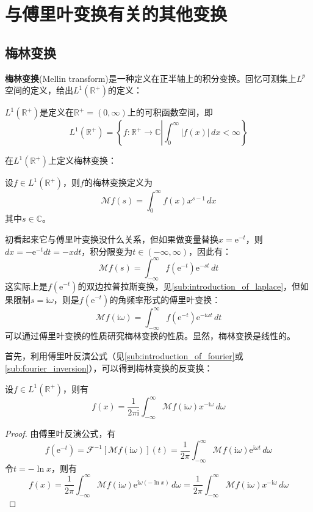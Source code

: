 \section{与傅里叶变换有关的其他变换}\label{sec:Other_Transforms}

\subsection{梅林变换}\label{sub:mellin}

\textbf{梅林变换}(Mellin transform)是一种定义在正半轴上的积分变换。回忆可测集上$L^p$空间的定义，给出$L^1(\mathbb{R}^+)$的定义：
\begin{definition}
    $L^1(\mathbb{R}^+)$是定义在$\mathbb{R}^+=(0,\infty)$上的可积函数空间，即
    $$L^1(\mathbb{R}^+)=\left\{f:\mathbb{R}^+\to\mathbb{C}\left|\int_0^{\infty}|f(x)|\,dx<\infty\right.\right\}$$
\end{definition}

在$L^1(\mathbb{R}^+)$上定义梅林变换：

\begin{definition}[梅林变换]
    设$f\in L^1(\mathbb{R}^+)$，则$f$的梅林变换定义为
    \[\mathcal{M} f(s)=\int_0^{\infty}f(x)x^{s-1}\,dx\]
    其中$s\in\mathbb{C}$。    
\end{definition}

初看起来它与傅里叶变换没什么关系，但如果做变量替换$x=\mathrm{e}^{-t}$，则$dx=-\mathrm{e}^{-t}dt=-x dt$，积分限变为$t\in(-\infty,\infty)$，因此有：
\[\mathcal{M} f(s)=\int_{-\infty}^{\infty}f(\mathrm{e}^{-t})\mathrm{e}^{-s t}\,dt\]
这实际上是$f(\mathrm{e}^{-t})$的双边拉普拉斯变换，见\ref{sub:introduction_of_laplace}，但如果限制$s=\mathrm{i}\omega$，则是$f(\mathrm{e}^{-t})$的角频率形式的傅里叶变换：
\[\mathcal{M} f(\mathrm{i}\omega)=\int_{-\infty}^{\infty}f(\mathrm{e}^{-t})\mathrm{e}^{-\mathrm{i}\omega t}\,dt\]
可以通过傅里叶变换的性质研究梅林变换的性质。显然，梅林变换是线性的。

首先，利用傅里叶反演公式（见\ref{sub:introduction_of_fourier}或\ref{sub:fourier_inversion}），可以得到梅林变换的反变换：
\begin{proposition}[梅林反变换]
    设$f\in L^1(\mathbb{R}^+)$，则有
    \[f(x)=\frac{1}{2\pi \mathrm{i}}\int_{-\infty}^{\infty}\mathcal{M} f(\mathrm{i}\omega)x^{-\mathrm{i}\omega}\,d\omega\]
\end{proposition}
\begin{proof}
    由傅里叶反演公式，有
    \[f(\mathrm{e}^{-t})=\mathcal{F} ^{-1}[\mathcal{M} f(\mathrm{i}\omega)](t)=\frac{1}{2\pi}\int_{-\infty}^{\infty}\mathcal{M} f(\mathrm{i}\omega)\mathrm{e}^{\mathrm{i}\omega t}\,d\omega\]
    令$t=-\ln x$，则有
    \[f(x)=\frac{1}{2\pi}\int_{-\infty}^{\infty}\mathcal{M} f(\mathrm{i}\omega)\mathrm{e}^{\mathrm{i}\omega (-\ln x)}\,d\omega=\frac{1}{2\pi}\int_{-\infty}^{\infty}\mathcal{M} f(\mathrm{i}\omega)x^{-\mathrm{i}\omega}\,d\omega\]
\end{proof}


